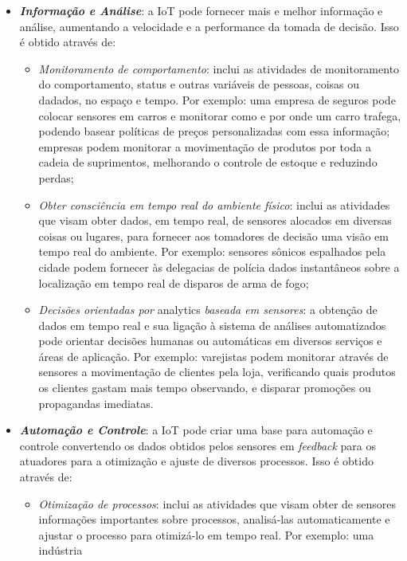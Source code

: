 \documentclass[pdftex, brazil, 12pt, twoside]{article}
\begin{document}
\begin{itemize}
\item \emph{\textbf{Informação e Análise}}: a IoT pode fornecer mais e melhor
  informação e análise, aumentando a velocidade e a performance da tomada de
  decisão. Isso é obtido através de:
  \begin{itemize}
  \item \emph{Monitoramento de comportamento}: inclui as atividades
    de monitoramento do comportamento, status e outras variáveis de pessoas,
    coisas ou dadados, no espaço e tempo. Por exemplo: uma empresa de seguros
    pode colocar sensores em carros e monitorar como e por onde um carro trafega,
    podendo basear políticas de preços personalizadas com essa informação; empresas
    podem monitorar a movimentação de produtos por toda a cadeia de suprimentos,
    melhorando o controle de estoque e reduzindo perdas;
  \item \emph{Obter consciência em tempo real do ambiente físico}: inclui as
    atividades que visam obter dados, em tempo real, de sensores alocados em
    diversas coisas ou lugares, para fornecer aos tomadores de decisão uma visão
    em tempo real do ambiente. Por exemplo: sensores sônicos espalhados pela cidade
    podem fornecer às delegacias de polícia dados instantâneos sobre a localização
    em tempo real de disparos de arma de fogo;
  \item \emph{Decisões orientadas por} analytics \emph{baseada em sensores}: a
    obtenção de dados em tempo real e sua ligação à sistema de análises automatizados
    pode orientar decisões humanas ou automáticas em diversos serviços e áreas de
    aplicação. Por exemplo: varejistas podem monitorar através de sensores a
    movimentação de clientes pela loja, verificando quais produtos os clientes
    gastam mais tempo observando, e disparar promoções ou propagandas imediatas.
  \end{itemize}
\item \emph{\textbf{Automação e Controle}}: a IoT pode criar uma base para
  automação e controle convertendo os dados obtidos pelos sensores em \emph{feedback}
  para os atuadores para a otimização e ajuste de diversos processos. Isso é obtido
  através de:
  \begin{itemize}
  \item \emph{Otimização de processos}: inclui as atividades que visam obter
    de sensores informações importantes sobre processos, analisá-las automaticamente
    e ajustar o processo para otimizá-lo em tempo real. Por exemplo: uma indústria

\end{itemize}
\end{itemize}
\end{document}
